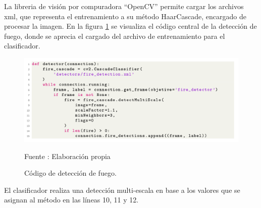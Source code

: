 La libreria de visión por compuradora ``OpenCV'' permite cargar los archivos xml, que representa el entrenamiento a su método HaarCascade, encargado de procesar la imagen. En la figura \ref{fig:fire_detector} se visualiza el código central de la detección de fuego, donde se aprecia el cargado del archivo de entrenamiento para el clasificador.\\



\begin{figure}[H]
    \begin{center}
        \includegraphics[width=18cm]{img/capitulo_5/fire_detector.png}
    \end{center}
    \begin{center}
        \caption{Código de detección de fuego.}
        Fuente : Elaboración propia
        \label{fig:fire_detector}
    \end{center}
\end{figure}

El clasificador realiza una detección multi-escala en base a los valores que se asignan al método en las líneas 10, 11 y 12.\\

